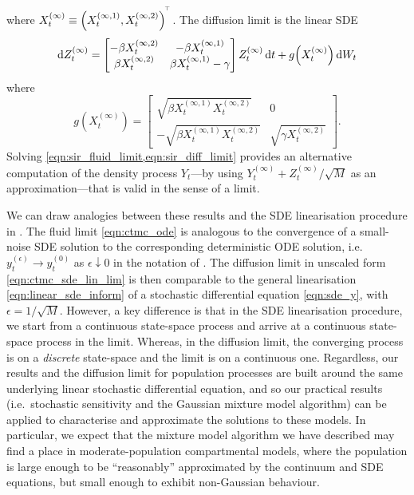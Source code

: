 where \(X_t^{(\infty)} \equiv \left(X_t^{(\infty, 1)}, X_t^{(\infty, 2)}\right)^{^{\!\top}}\).
The diffusion limit is the linear SDE
\begin{equation}
	\dif Z_t^{(\infty)} = \begin{bmatrix}
		-\beta X_t^{(\infty, 2)} & -\beta X_t^{(\infty, 1)}         \\
		\beta X_t^{(\infty, 2)}  & \beta X_t^{(\infty, 1)} - \gamma
	\end{bmatrix} Z_t^{(\infty)}\dif t + g\!\left(X_t^{(\infty)}\right)\dif W_t
	\label{eqn:sir_diff_limit}
\end{equation}
where
\[
	g\!\left(X_t^{(\infty)}\right) = \begin{bmatrix}
		\sqrt{\beta X_t^{(\infty, 1)} X_t^{(\infty, 2)}}  & 0                               \\
		-\sqrt{\beta X_t^{(\infty, 1)} X_t^{(\infty, 2)}} & \sqrt{\gamma X_t^{(\infty, 2)}}
	\end{bmatrix}.
\]
Solving \cref{eqn:sir_fluid_limit,eqn:sir_diff_limit} provides an alternative computation of the density process \(Y_t\)---by using \(Y_t^{(\infty)} + Z_t^{(\infty)} / \sqrt{M}\) as an approximation---that is valid in the sense of a limit.

We can draw analogies between these results and the SDE linearisation procedure in .
The fluid limit \cref{eqn:ctmc_ode} is analogous to the convergence of a small-noise SDE solution to the corresponding deterministic ODE solution, i.e. \(y_t^{(\epsilon)} \to y_t^{(0)}\) as \(\epsilon \downarrow 0\) in the notation of .
The diffusion limit in unscaled form \cref{eqn:ctmc_sde_lin_lim} is then comparable to the general linearisation \cref{eqn:linear_sde_inform} of a stochastic differential equation \cref{eqn:sde_y}, with \(\epsilon = 1/\sqrt{M}\).
However, a key difference is that in the SDE linearisation procedure, we start from a continuous state-space process and arrive at a continuous state-space process in the limit.
Whereas, in the diffusion limit, the converging process is on a \emph{discrete} state-space and the limit is on a continuous one.
Regardless, our results and the diffusion limit for population processes are built around the same underlying linear stochastic differential equation, and so our practical results (i.e.\ stochastic sensitivity and the Gaussian mixture model algorithm) can be applied to characterise and approximate the solutions to these models.
In particular, we expect that the mixture model algorithm we have described may find a place in moderate-population compartmental models, where the population is large enough to be ``reasonably'' approximated by the continuum and SDE equations, but small enough to exhibit non-Gaussian behaviour.

